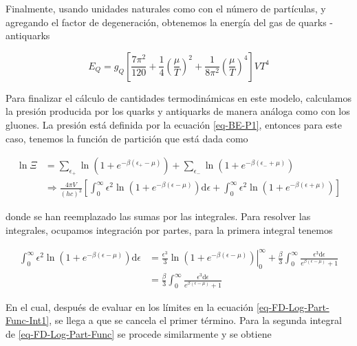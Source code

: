 Finalmente, usando unidades naturales como con el número de partículas, y agregando el factor de degeneración, obtenemos la energía del gas de quarks - antiquarks

\begin{equation}\label{eq-FD-Quark-Energy}
{E}_{Q} = {g}_{Q} \left[\frac{7{\pi}^{2}}{120} + \frac{1}{4} \left(\frac{\mu}{T} \right)^{2} + \frac{1}{8{\pi}^{2}} \left(\frac{\mu}{T} \right)^{4}\right]V{T}^{4}
\end{equation}

Para finalizar el cálculo de cantidades termodinámicas en este modelo, calculamos la presión producida por los quarks y antiquarks de manera análoga como con los gluones. La presión está definida por la ecuación \eqref{eq-BE-P1}, entonces para este caso, tenemos la función de partición que está dada como

\begin{equation}\label{eq-FD-Log-Part-Func}
\begin{split}
\ln \Xi &= \sum_{{\epsilon}_{+}} \ln \left(1+{e}^{-\beta({\epsilon}_{+}-\mu)} \right) + \sum_{{\epsilon}_{-}} \ln \left(1+{e}^{-\beta({\epsilon}_{-}+\mu)} \right) \\ 
& \Rightarrow \frac{4 \pi V}{(hc)^{3}} \left[ \int_{0}^{\infty} {\epsilon}^{2} \ln \left(1 + {e}^{-\beta(\epsilon - \mu)} \right) \mathrm{d}\epsilon + \int_{0}^{\infty} {\epsilon}^{2} \ln \left(1 + {e}^{-\beta(\epsilon + \mu)} \right) \right]
\end{split}
\end{equation}

donde se han reemplazado las sumas por las integrales. Para resolver las integrales, ocupamos integración por partes, para la primera integral tenemos

\begin{equation}\label{eq-FD-Log-Part-Func-Int1}
\begin{split}
\int_{0}^{\infty} {\epsilon}^{2} \ln \left(1 + {e}^{-\beta(\epsilon-\mu)} \right) \mathrm{d} \epsilon & = \left. \frac{{\epsilon}^{3}}{3} \ln \left(1+{e}^{-\beta(\epsilon-\mu)} \right) \right|_{0}^{\infty} + \frac{\beta}{3} \int_{0}^{\infty} \frac{ {\epsilon}^{3} \mathrm{d} \epsilon}{{e}^{\beta(\epsilon - \mu)} + 1} \\
& = \frac{\beta}{3} \int_{0}^{\infty} \frac{{\epsilon}^{3} \mathrm{d} \epsilon}{{e}^{\beta (\epsilon - \mu)} + 1 }
\end{split}
\end{equation}

En el cual, después de evaluar en los límites en la ecuación \eqref{eq-FD-Log-Part-Func-Int1}, se llega a que se cancela el primer término. Para la segunda integral de \eqref{eq-FD-Log-Part-Func} se procede similarmente y se obtiene

